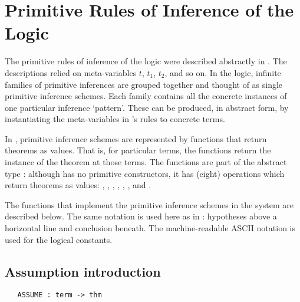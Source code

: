\section{Primitive Rules of Inference of the \HOL{} Logic}
\label{rules}

%
The primitive rules of inference of the logic were described
abstractly in \LOGIC. The descriptions relied on meta-variables $t$,
$t_1$, $t_2$, and so on.  In the \HOL{} logic, infinite families of
primitive inferences are grouped together and thought of as single
primitive inference schemes. %
%
%
Each family contains all the concrete instances of one particular
inference `pattern'. These can be produced, in abstract form, by
instantiating the meta-variables in \LOGIC{}'s rules to concrete
terms.

In \HOL, primitive inference schemes are represented by \ML{} functions
that return theorems as values.  That is, for particular \HOL{} terms,
the \ML{} functions return the instance of the theorem at those terms.
The \ML{} functions are part of the \ML{} abstract type
:
%
%
although  has no primitive constructors, it has (eight)
operations which return theorems as values: , ,
, , , ,  and
.
%

The \ML{} functions that implement the primitive inference schemes in the
\HOL{} system are described below.  The same notation
%
%
is used here as in \LOGIC: hypotheses above a horizontal line and
conclusion
%
 beneath. The machine-readable
{\small ASCII} notation is used for the logical constants.

\subsection{Assumption introduction}
%

\begin{holboxed}
\begin{verbatim}
   ASSUME : term -> thm
\end{verbatim}\end{holboxed}

